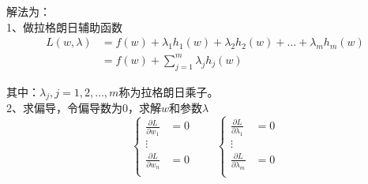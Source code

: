 		解法为：\\
		1、做拉格朗日辅助函数
		\begin{align*}
		L(w,\lambda)&=f(w)+\lambda _1h_1(w)+\lambda _2h_2(w)+\dots +\lambda _mh_m(w)\\
		&=f(w)+\sum_{j=1}^m\lambda_jh_j(w)
		\end{align*}
		\par
		其中：$\lambda_j,j=1,2,\dots,m$称为拉格朗日乘子。\\
		2、求偏导，令偏导数为0，求解$w$和参数$\lambda$
		\begin{equation*}
		\left\{
		\begin{aligned}
		\frac {\partial L}{\partial w_1}&=0\\
		\vdots \\
		\frac {\partial L}{\partial w_n}&=0\\
		\end{aligned}
		\right.
		\qquad
		\left\{
		\begin{aligned}
		\frac {\partial L}{\partial \lambda_1}&=0\\
		\vdots \\
		\frac {\partial L}{\partial \lambda_m}&=0\\
		\end{aligned}
		\right.
		\end{equation*}

